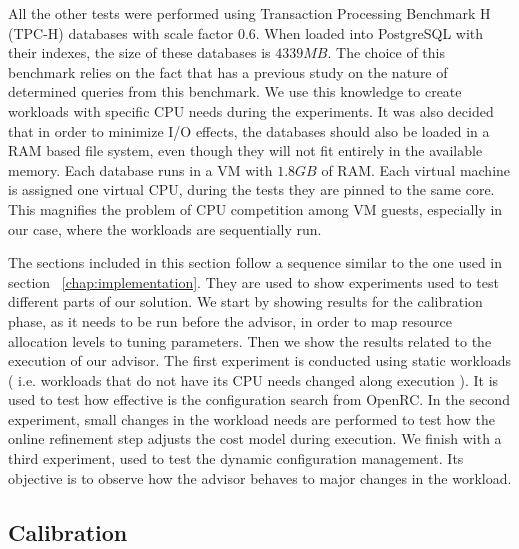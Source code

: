 \documentclass[jidm,a4paper]{jidm} %
\begin{document}
All the other tests were performed using Transaction Processing Benchmark H (TPC-H) databases with scale factor $0.6$. When loaded into PostgreSQL with their indexes, the size of these databases is $4339 MB$.  The choice of this benchmark relies on the fact that \cite{Soror:2008:AVM:1376616.1376711} has a previous study on the nature of determined queries from this benchmark. We use this knowledge to create workloads with specific CPU needs during the experiments.  It was also decided that in order to minimize I/O effects, the databases should also be loaded  in a RAM based file system, even though they will not fit entirely in the available memory. Each database runs in a VM with $1.8 GB$ of RAM.  Each virtual machine is assigned one virtual CPU, during the tests they are pinned to the same core. This magnifies the problem of CPU competition among VM guests, especially in our case, where the workloads are sequentially run. 

The sections included in this section follow a sequence similar to the one used in section ~\ref{chap:implementation}. They are used to show experiments used to test different parts of our solution. We start by showing results for the calibration phase, as it needs to be run before the advisor, in order to map resource allocation levels to tuning parameters. Then we show the results related to the execution of our advisor. The first experiment is conducted using static workloads ( i.e. workloads that do not have its CPU needs changed along execution ). It is used to test how effective is the configuration search from OpenRC. In the second experiment, small changes in the workload needs are performed to test how the online refinement step adjusts the cost model during execution. We finish with a third experiment, used to test the dynamic configuration management. Its objective is to observe how the advisor behaves to major changes in the workload.


\subsection{Calibration}
\end{document}
